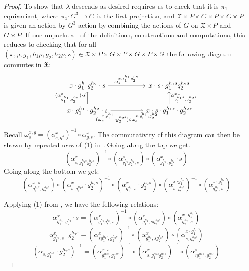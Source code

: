 \documentclass[12pt, final]{amsart}
\theoremstyle{remark}
\theoremstyle{definition}
\theoremstyle{plain}
\newcommand{\fX}{{\mathfrak X}}
\begin{document}
\begin{proof}
    To show that $\lambda$ descends as desired requires us to check that it is 
    $\pi_1$-equivariant, where $\pi_1:G^{3} \to G$ is the first projection,
    and $\fX\times P \times G \times P \times G \times P$ is given an action by 
    $G^{3}$ action by combining the actions of $G$ on $\fX \times P$ and 
    $G \times P$. If one unpacks all of the definitions, constructions and computations, 
    this reduces to checking that for all 
    $(x,p,g_{1},h_{1}p,g_{2},h_{2}p,s) \in \fX\times P \times G \times P \times G \times P \times G$
    the following diagram commutes in $\fX$:
    $$
    \begin{tikzcd}[column sep=huge]
        {x\cdot g_{1}^{h_{1}}g_{2}^{h_{2}}\cdot s} & {x\cdot s\cdot g_{1}^{h_{1}s}g_{2}^{h_{2}s}} \\
        {x\cdot g_{1}^{h_{1}}\cdot g_{2}^{h_{2}}\cdot s} & {x\cdot s\cdot g_{1}^{h_{1}s}\cdot g_{2}^{h_{2}s}}
        \arrow["{\omega_{s}^{x,g_{1}^{h_{1}}g_{2}^{h_{2}}}}", from=1-1, to=1-2]
        \arrow["{(\alpha_{g_{1}^{h_{1}},g_{2}^{h_{2}}}^{x})\cdot s}", from=2-1, to=1-1]
        \arrow["{(\omega_{s}^{x,g_{1}^{h_{1}}}\cdot g_{2}^{h_{2}s})\circ\omega_{s}^{x\cdot g_{1}^{h_{1}},g_{2}^{h_{2}}}}"', from=2-1, to=2-2]
        \arrow["{\alpha_{g_{1}^{h_{1}s},g_{2}^{h_{2}s}}^{x\cdot s}}"', from=2-2, to=1-2]
    \end{tikzcd}
    $$
    Recall $\omega_{s}^{x,g} = (\alpha_{s,g^{s}}^{x})^{-1} \circ \alpha_{g,s}^{x}$.
    The commutativity of this diagram can then be shown by repeated uses of (1) in 
    .
    \iffalse
    Going along the top we get:
    $$(\alpha_{s,g_{1}^{h_{1}s}g_{2}^{h_{2}s}}^{x})^{-1}\circ (\alpha_{g_{1}^{h_{1}}g_{2}^{h_{2}},s}^{x})\circ(\alpha_{g_{1}^{h_{1}},g_{2}^{h_{2}}}^{x}\cdot s) $$
    Going along the bottom we get:
    $$(\alpha_{g_{1}^{h_{1}s},g_{2}^{h_{2}s}}^{x\cdot s}) \circ (\alpha_{s,g_{1}^{h_{1}s}}^{x}\cdot g_{2}^{h_{2}s})^{-1}\circ (\alpha_{g_{1}^{h_{1}},s}^{x}\cdot g_{2}^{h_{2}s})\circ (\alpha_{s,g_{2}^{h_{2}s}}^{x\cdot g_{1}^{h_{1}}})^{-1}\circ(\alpha_{g_{2}^{h_{2}},s}^{x\cdot g_{1}^{h_{1}}}) $$

    Applying (1) from , we have the following relations:
    $$\alpha_{g_{1}^{h_{1}},g_{2}^{h_{2}}}^{x} \cdot s = (\alpha_{g_{1}^{h_{1}}g_{2}^{h_{2}},s}^{x})^{-1}\circ (\alpha_{g_{1}^{h_{1}},sg_{2}^{h_{2}s}}^{x})\circ (\alpha_{g_{2}^{h_{2}},s}^{x\cdot g_{1}^{h_{1}}})$$
    $$\alpha_{g_{1}^{h_{1}},s}^{x} \cdot g_{2}^{h_{2}s} = (\alpha_{sg_{1}^{h_{1}s},g_{2}^{h_{2}s}}^{x})^{-1}\circ (\alpha_{g_{1}^{h_{1}},sg_{2}^{h_{2}s}}^{x})\circ (\alpha_{s,g_{2}^{h_{2}s}}^{x\cdot g_{1}^{h_{1}}})$$
    $$(\alpha_{s,g_{1}^{h_{1}s}}\cdot g_{2}^{h_{2}s})^{-1} = (\alpha_{g_{1}^{h_{1}s},g_{2}^{h_{2}s}}^{x\cdot s})^{-1}\circ(\alpha_{s,g_{1}^{h_{1}s}g_{2}^{h_{2}s}}^{x})^{-1}\circ(\alpha_{sg_{1}^{h_{1}s},g_{2}^{h_{2}s}}^{x})$$


\end{proof}
\end{document}

